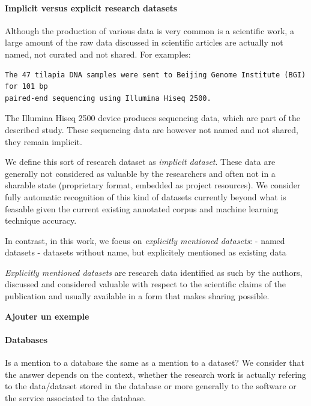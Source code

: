 \documentclass[
]{article}
\begin{document}
\hypertarget{implicit-versus-explicit-research-datasets}{%
\paragraph{Implicit versus explicit research
datasets}\label{implicit-versus-explicit-research-datasets}}

Although the production of various data is very common is a scientific
work, a large amount of the raw data discussed in scientific articles
are actually not named, not curated and not shared. For examples:

\begin{verbatim}
The 47 tilapia DNA samples were sent to Beijing Genome Institute (BGI) for 101 bp 
paired-end sequencing using Illumina Hiseq 2500. 
\end{verbatim}

The Illumina Hiseq 2500 device produces sequencing data, which are part
of the described study. These sequencing data are however not named and
not shared, they remain implicit.

We define this sort of research dataset as \emph{implicit dataset}.
These data are generally not considered as valuable by the researchers
and often not in a sharable state (proprietary format, embedded as
project resources). We consider fully automatic recognition of this kind
of datasets currently beyond what is feasable given the current existing
annotated corpus and machine learning technique accuracy.

In contrast, in this work, we focus on \emph{explicitly mentioned
datasets}: - named datasets - datasets without name, but explicitely
mentioned as existing data

\emph{Explicitly mentioned datasets} are research data identified as
such by the authors, discussed and considered valuable with respect to
the scientific claims of the publication and usually available in a form
that makes sharing possible.

\textbf{Ajouter un exemple}

\hypertarget{databases}{%
\paragraph{Databases}\label{databases}}

Is a mention to a database the same as a mention to a dataset? We
consider that the answer depends on the context, whether the research
work is actually refering to the data/dataset stored in the database or
more generally to the software or the service associated to the
database.
\end{document}
